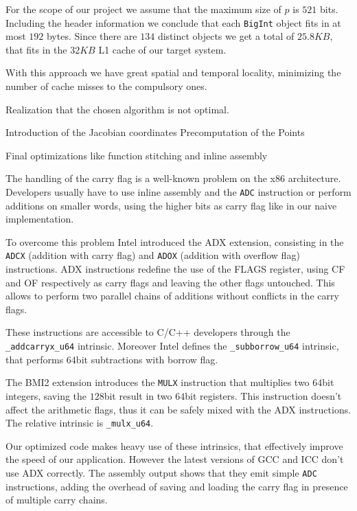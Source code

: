 For the scope of our project we assume that the maximum size of $p$ is $521$ bits. Including the header information we conclude that each \texttt{BigInt} object fits in at most $192$ bytes. Since there are $134$ distinct objects we get a total of $25.8KB$, that fits in the $32KB$ L1 cache of our target system.

With this approach we have great spatial and temporal locality, minimizing the number of cache misses to the compulsory ones.

Realization that the chosen algorithm is not optimal.

Introduction of the Jacobian coordinates
Precomputation of the Points

Final optimizations like function stitching and inline assembly 

The handling of the carry flag is a well-known problem on the x86 architecture. Developers usually have to use inline assembly and the \texttt{ADC} instruction or perform additions on smaller words, using the higher bits as carry flag like in our naive implementation.

To overcome this problem Intel introduced the ADX extension, consisting in the \texttt{ADCX} (addition with carry flag) and \texttt{ADOX} (addition with overflow flag) instructions. ADX instructions redefine the use of the FLAGS register, using CF and OF respectively as carry flags and leaving the other flags untouched. This allows to perform two parallel chains of additions without conflicts in the carry flags.

These instructions are accessible to C/C++ developers through the \texttt{\_addcarryx\_u64} intrinsic. Moreover Intel defines the \texttt{\_subborrow\_u64} intrinsic, that performs $64$bit subtractions with borrow flag.

The BMI2 extension introduces the \texttt{MULX} instruction that multiplies two $64$bit integers, saving the $128$bit result in two $64$bit registers. This instruction doesn't affect the arithmetic flags, thus it can be safely mixed with the ADX instructions. The relative intrinsic is \texttt{\_mulx\_u64}. 

Our optimized code makes heavy use of these intrinsics, that effectively improve the speed of our application. However the latest versions of GCC and ICC don't use ADX correctly. The assembly output shows that they emit simple \texttt{ADC} instructions, adding the overhead of saving and loading the carry flag in presence of multiple carry chains.

